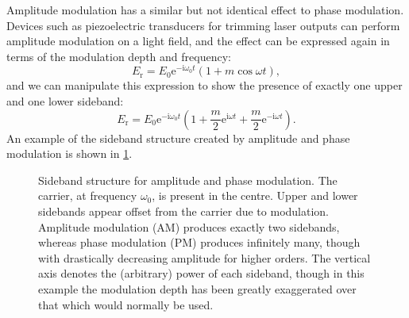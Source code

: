 Amplitude modulation has a similar but not identical effect to phase modulation. Devices such as piezoelectric transducers for trimming laser outputs can perform amplitude modulation on a light field, and the effect can be expressed again in terms of the modulation depth and frequency:
\begin{equation}
  E_{\text{r}} = E_0 \text{e}^{-\text{i} \omega_0 t} \left( 1 + m \cos{\omega t} \right),
\end{equation}
and we can manipulate this expression to show the presence of exactly one upper and one lower sideband:
\begin{equation}
  \label{eq:field-amp-mod}
  E_{\text{r}} = E_0 \text{e}^{-\text{i} \omega_0 t} \left( 1 + \frac{m}{2} \text{e}^{\text{i} \omega t} + \frac{m}{2} \text{e}^{-\text{i} \omega t} \right).
\end{equation}
An example of the sideband structure created by amplitude and phase modulation is shown in \cref{fig:sideband-structure}.

\begin{figure}
  \centering
  
  \caption[Sideband structure for amplitude and phase modulation]{\label{fig:sideband-structure}Sideband structure for amplitude and phase modulation. The carrier, at frequency $\omega_0$, is present in the centre. Upper and lower sidebands appear offset from the carrier due to modulation. Amplitude modulation (AM) produces exactly two sidebands, whereas phase modulation (PM) produces infinitely many, though with drastically decreasing amplitude for higher orders. The vertical axis denotes the (arbitrary) power of each sideband, though in this example the modulation depth has been greatly exaggerated over that which would normally be used.}
\end{figure}